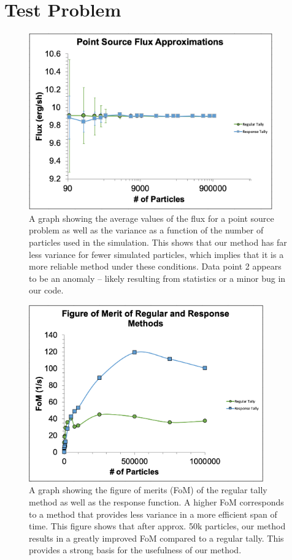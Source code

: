 \documentclass[]{article}
\begin{document}
\section{Test Problem}
	\begin{figure} [h!]
		\centering
		\includegraphics[height=3in]{Figures/point_src_errors.png}
		\caption{A graph showing the average values of the flux for a point source problem as well as the variance as a function of the number of particles used in the simulation. This shows that our method has far less variance for fewer simulated particles, which implies that it is a more reliable method under these conditions. Data point 2 appears to be an anomaly – likely resulting from statistics or a minor bug in our code.}
		\label{fig:point_source_errors}
	\end{figure}

	\begin{figure} [h!]
		\centering
		\includegraphics[height=3in]{Figures/point_src_fom.png}
		\caption{A graph showing the figure of merits (FoM) of the regular tally method as well as the response function. A higher FoM corresponds to a method that provides less variance in a more efficient span of time. This figure shows that after approx. 50k particles, our method results in a greatly improved FoM compared to a regular tally. This provides a strong basis for the usefulness of our method.
}
		\label{fig:point_source_FoM}
	\end{figure}
\end{document}
